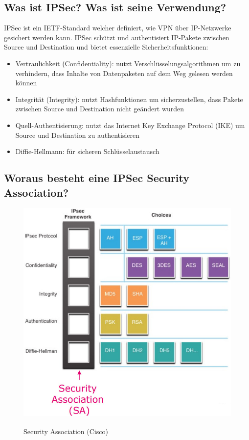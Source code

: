 \subsection*{Was ist IPSec? Was ist seine Verwendung?}
IPSec ist ein IETF-Standard welcher definiert, wie VPN über IP-Netzwerke gesichert werden kann. IPSec schützt und authentisiert IP-Pakete zwischen Source und Destination und bietet essenzielle Sicherheitsfunktionen:
\begin{itemize}
    \item Vertraulichkeit (Confidentiality): nutzt Verschlüsselungsalgorithmen um zu verhindern, dass Inhalte von Datenpaketen auf dem Weg gelesen werden können
    \item Integrität (Integrity): nutzt Hashfunktionen um sicherzustellen, dass Pakete zwischen Source und Destination nicht geändert wurden
    \item Quell-Authentisierung: nutzt das Internet Key Exchange Protocol (IKE) um Source und Destination zu authentisieren
    \item Diffie-Hellmann: für sicheren Schlüsselaustausch
\end{itemize}

\subsection*{Woraus besteht eine IPSec Security Association?}
\begin{figure}[H]
    \begin{center}
    \label{pic:SecurityAssociation}
    \includegraphics[width=\textwidth]{images/security_association.jpg}
    \caption{Security Association (\textsuperscript{\textcopyright}Cisco)}
    \end{center}
\end{figure}

